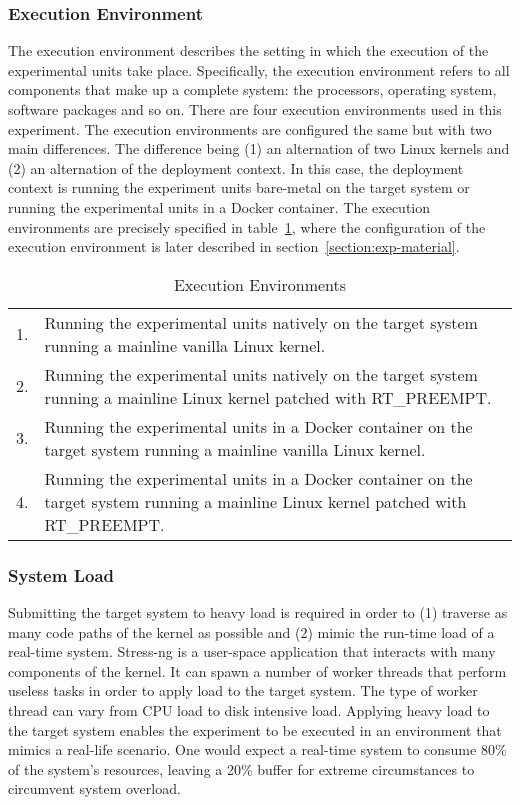 \subsubsection*{Execution Environment}
The execution environment describes the setting in which the execution of the experimental units take place. Specifically, the execution environment refers to all components that make up a complete system: the processors, operating system, software packages and so on. There are four execution environments used in this experiment. The execution environments are configured the same but with two main differences. The difference being (1) an alternation of two Linux kernels and (2) an alternation of the deployment context. In this case, the deployment context is running the experiment units bare-metal on the target system or running the experimental units in a Docker container. The execution environments are precisely specified in table~\ref{table:exe-env}, where the configuration of the execution environment is later described in section~\ref{section:exp-material}.


\begin{table}[h]
\begin{tabular}{l|p{14cm}}
1. & Running the experimental units natively on the target system running a mainline vanilla Linux kernel.                               \\
2. & Running the experimental units natively on the target system running a mainline Linux kernel patched with RT\_PREEMPT.              \\
3. & Running the experimental units in a Docker container on the target system running a mainline vanilla Linux kernel.                  \\
4. & Running the experimental units in a Docker container on the target system running a mainline Linux kernel patched with RT\_PREEMPT.
\end{tabular}
\centering
\caption{Execution Environments}
\label{table:exe-env}
\end{table}


\subsubsection*{System Load}
Submitting the target system to heavy load is required in order to (1) traverse as many code paths of the kernel as possible and (2) mimic the run-time load of a real-time system. Stress-ng \cite{stress-ng} is a user-space application that interacts with many components of the kernel. It can spawn a number of worker threads that perform useless tasks in order to apply load to the target system. The type of worker thread can vary from CPU load to disk intensive load. Applying heavy load to the target system enables the experiment to be executed in an environment that mimics a real-life scenario. One would expect a real-time system to consume 80\% of the system's resources, leaving a 20\% buffer for extreme circumstances to circumvent system overload. \\

